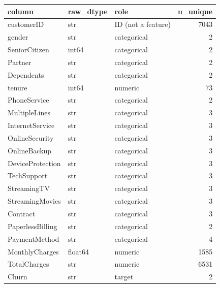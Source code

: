 \begin{tabular}{lllr}
\toprule
column & raw\_dtype & role & n\_unique \\
\midrule
customerID & str & ID (not a feature) & 7043 \\
gender & str & categorical & 2 \\
SeniorCitizen & int64 & categorical & 2 \\
Partner & str & categorical & 2 \\
Dependents & str & categorical & 2 \\
tenure & int64 & numeric & 73 \\
PhoneService & str & categorical & 2 \\
MultipleLines & str & categorical & 3 \\
InternetService & str & categorical & 3 \\
OnlineSecurity & str & categorical & 3 \\
OnlineBackup & str & categorical & 3 \\
DeviceProtection & str & categorical & 3 \\
TechSupport & str & categorical & 3 \\
StreamingTV & str & categorical & 3 \\
StreamingMovies & str & categorical & 3 \\
Contract & str & categorical & 3 \\
PaperlessBilling & str & categorical & 2 \\
PaymentMethod & str & categorical & 4 \\
MonthlyCharges & float64 & numeric & 1585 \\
TotalCharges & str & numeric & 6531 \\
Churn & str & target & 2 \\
\bottomrule
\end{tabular}
